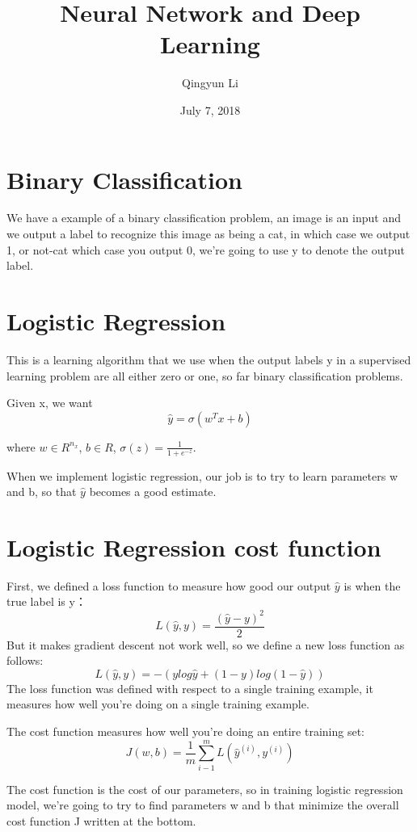 \documentclass{article}
\author{Qingyun Li}
\date{July 7, 2018}
\title{Neural Network and Deep Learning}
\begin{document}
\maketitle
\section{Binary Classification} 
\par We have a example of a binary classification problem, an image is an input and we output a label to recognize this image as being a cat, in which case we output 1, or not-cat which case you output 0, we're going to use y to denote the output label.
\section{Logistic Regression}
\par This is a learning algorithm that we use when the output labels y in a supervised learning problem are all either zero or one, so far binary classification problems.
\par Given x, we want
\begin{equation}
\hat{y} = \sigma(w^{T}x+b)
\end{equation}
\par where $w \in R^{n_{x}}$, $b \in R$, $\sigma(z) = \frac{1}{1+e^{-z}}$.
\par When we implement logistic regression, our job is to try to learn parameters w and b, so that $\hat{y}$ becomes a good estimate.
\section{Logistic Regression cost function}
\par First, we defined a loss function to measure how good our output $\hat{y}$ is when the true label is y：
\begin{equation}
L(\hat{y},y)=\frac{(\hat{y}-y)^{2}}{2}
\end{equation}
But it makes gradient descent not work well, so we define a new loss function as follows:
\begin{equation}
L(\hat{y},y)=-(ylog\hat{y}+(1-y)log(1-\hat{y}))
\end{equation}
The loss function was defined with respect to a single training example, it measures how well you're doing on a single training example.
\par The cost function measures how well you're doing an entire training set:
\begin{equation}
J(w,b)=\frac{1}{m}\sum_{i-1}^{m}L(\hat{y}^{(i)},y^{(i)})
\end{equation}
\par The cost function is the cost of our parameters, so in training logistic regression model, we're going to try to find parameters w and b that minimize the overall cost function J written at the bottom.
\end{document}
